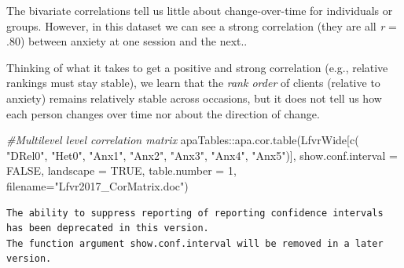 \documentclass[
  11pt,
]{book}
\newenvironment{Shaded}{\begin{snugshade}}{\end{snugshade}}
\newcommand{\AttributeTok}[1]{\textcolor[rgb]{0.77,0.63,0.00}{#1}}
\newcommand{\CommentTok}[1]{\textcolor[rgb]{0.56,0.35,0.01}{\textit{#1}}}
\newcommand{\ConstantTok}[1]{\textcolor[rgb]{0.00,0.00,0.00}{#1}}
\newcommand{\DecValTok}[1]{\textcolor[rgb]{0.00,0.00,0.81}{#1}}
\newcommand{\FunctionTok}[1]{\textcolor[rgb]{0.00,0.00,0.00}{#1}}
\newcommand{\NormalTok}[1]{#1}
\newcommand{\SpecialCharTok}[1]{\textcolor[rgb]{0.00,0.00,0.00}{#1}}
\newcommand{\StringTok}[1]{\textcolor[rgb]{0.31,0.60,0.02}{#1}}
\begin{document}
The bivariate correlations tell us little about change-over-time for individuals or groups. However, in this dataset we can see a strong correlation (they are all \emph{r} = .80) between anxiety at one session and the next..

Thinking of what it takes to get a positive and strong correlation (e.g., relative rankings must stay stable), we learn that the \emph{rank order} of clients (relative to anxiety) remains relatively stable across occasions, but it does not tell us how each person changes over time nor about the direction of change.

\begin{Shaded}
\begin{Highlighting}[]
\CommentTok{\#Multilevel level correlation matrix}
\NormalTok{apaTables}\SpecialCharTok{::}\FunctionTok{apa.cor.table}\NormalTok{(LfvrWide[}\FunctionTok{c}\NormalTok{(}
\StringTok{"DRel0"}\NormalTok{, }\StringTok{"Het0"}\NormalTok{, }\StringTok{"Anx1"}\NormalTok{, }\StringTok{"Anx2"}\NormalTok{, }\StringTok{"Anx3"}\NormalTok{, }\StringTok{"Anx4"}\NormalTok{, }\StringTok{"Anx5"}\NormalTok{)], }\AttributeTok{show.conf.interval =} \ConstantTok{FALSE}\NormalTok{, }\AttributeTok{landscape =} \ConstantTok{TRUE}\NormalTok{, }\AttributeTok{table.number =} \DecValTok{1}\NormalTok{, }\AttributeTok{filename=}\StringTok{"Lfvr2017\_CorMatrix.doc"}\NormalTok{)}
\end{Highlighting}
\end{Shaded}

\begin{verbatim}
The ability to suppress reporting of reporting confidence intervals has been deprecated in this version.
The function argument show.conf.interval will be removed in a later version.
\end{verbatim}
\end{document}

